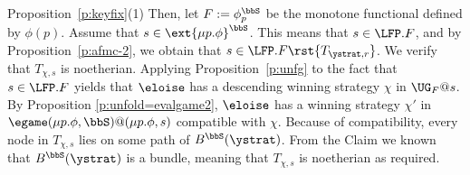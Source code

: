 \begin{proofof}{Proposition~\ref{p:keyfix}(1)}
Then, let $F := \phi_{p}^{\bbS}$ be the monotone functional defined by $\phi(p)$.
Assume that $s \in \ext{\mu p.\phi}^{\bbS}$. 
This means that $s \in \LFP. F$, and by Proposition~\ref{p:afmc-2}, we obtain 
that $s \in \LFP. F\rst{T_{\ystrat,r}}$.
We verify that $T_{\chi, s}$ is noetherian.
Applying Proposition~\ref{p:unfg} to the fact that $s \in \LFP. F$ yields that 
$\eloise$ has a descending winning strategy $\chi$ in $\UG_{F}@s$. 
By Proposition \ref{p:unfold=evalgame2}, $\eloise$ has a winning strategy 
$\chi'$ in $\egame(\mu p.\phi,\bbS)@(\mu p.\phi,s)$ compatible with $\chi$.
Because of compatibility, every node in $T_{\chi, s}$ lies on some path of 
$B^\bbS(\ystrat)$. 
From the Claim
we known that $B^\bbS(\ystrat)$ is a bundle, meaning that  $T_{\chi, s}$ is
noetherian as required.   
\end{proofof}

